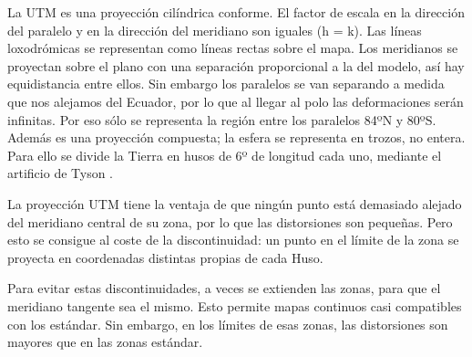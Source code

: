 \documentclass[a4paper,12pt,twoside]{article}
\begin{document}
La UTM es una proyección cilíndrica conforme. El factor de escala en la dirección del paralelo y en la dirección del meridiano son iguales (h = k). Las líneas loxodrómicas se representan como líneas rectas sobre el mapa. Los meridianos se proyectan sobre el plano con una separación proporcional a la del modelo, así hay equidistancia entre ellos. Sin embargo los paralelos se van separando a medida que nos alejamos del Ecuador, por lo que al llegar al polo las deformaciones serán infinitas. Por eso sólo se representa la región entre los paralelos 84ºN y 80ºS. Además es una proyección compuesta; la esfera se representa en trozos, no entera. Para ello se divide la Tierra en husos de 6º de longitud cada uno, mediante el artificio de Tyson .

La proyección UTM tiene la ventaja de que ningún punto está demasiado alejado del meridiano central de su zona, por lo que las distorsiones son pequeñas. Pero esto se consigue al coste de la discontinuidad: un punto en el límite de la zona se proyecta en coordenadas distintas propias de cada Huso.

Para evitar estas discontinuidades, a veces se extienden las zonas, para que el meridiano tangente sea el mismo. Esto permite mapas continuos casi compatibles con los estándar. Sin embargo, en los límites de esas zonas, las distorsiones son mayores que en las zonas estándar.
\end{document}
